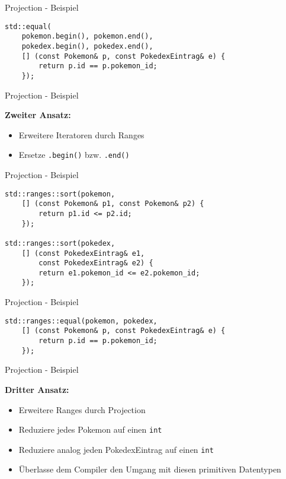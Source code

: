 \begin{frame}[fragile]{Projection - Beispiel}
    \begin{verbatim}
std::equal(
    pokemon.begin(), pokemon.end(),
    pokedex.begin(), pokedex.end(),
    [] (const Pokemon& p, const PokedexEintrag& e) {
        return p.id == p.pokemon_id;
    });
    \end{verbatim}
\end{frame}

\begin{frame}{Projection - Beispiel}
    \begin{center}
        \textbf{Zweiter Ansatz:}
    \end{center}

    \begin{itemize}
        \item Erweitere Iteratoren durch Ranges
        \item Ersetze \texttt{.begin()} bzw. \texttt{.end()}
    \end{itemize}
\end{frame}

\begin{frame}[fragile]{Projection - Beispiel}
    \begin{verbatim}
std::ranges::sort(pokemon,
    [] (const Pokemon& p1, const Pokemon& p2) {
        return p1.id <= p2.id;
    });

std::ranges::sort(pokedex,
    [] (const PokedexEintrag& e1,
        const PokedexEintrag& e2) {
        return e1.pokemon_id <= e2.pokemon_id;
    });
    \end{verbatim}
\end{frame}

\begin{frame}[fragile]{Projection - Beispiel}
    \begin{verbatim}
std::ranges::equal(pokemon, pokedex,
    [] (const Pokemon& p, const PokedexEintrag& e) {
        return p.id == p.pokemon_id;
    });
    \end{verbatim}
\end{frame}

\begin{frame}{Projection - Beispiel}
    \begin{center}
        \textbf{Dritter Ansatz:}
    \end{center}

    \begin{itemize}
        \item Erweitere Ranges durch Projection
        \item Reduziere jedes Pokemon auf einen \texttt{int}
        \item Reduziere analog jeden PokedexEintrag auf einen \texttt{int}
        \item Überlasse dem Compiler den Umgang mit diesen primitiven Datentypen
    \end{itemize}
\end{frame}

